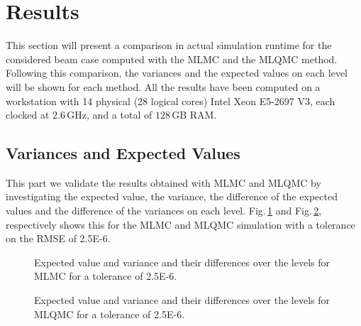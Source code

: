 \documentclass{ICASP13Paper}
\begin{document}
\section{Results}
This section will present a comparison in actual simulation runtime for the considered beam case computed with the MLMC and the MLQMC method. Following this comparison, the variances and the expected values on each level will be shown for each method.  All the results have been computed on a workstation with 14 physical (28 logical cores) Intel Xeon E5-2697 V3, each clocked at $2.6 \,\mathrm{GHz}$, and a total of $128 \,\mathrm{GB}$ RAM.

\subsection{Variances and Expected Values}
This part we validate the results obtained with MLMC and MLQMC by investigating the expected value, the variance, the difference of the expected values and the difference of the variances on each level. Fig.\,\ref{fig:MLMC_var_exp} and Fig.\,\ref{fig:MLQMC_var_exp}, respectively shows this for the MLMC and MLQMC simulation with a tolerance on the RMSE of 2.5E-6.

\begin{figure}[H]
\centering
\begin{subfigure}[b]{0.5\linewidth}
\scalebox{0.5}{
}
\end{subfigure}
\begin{subfigure}[b]{0.5\linewidth}
\scalebox{0.5}{
}
\end{subfigure}
\caption{Expected value and variance and their differences over the levels for MLMC for a tolerance of 2.5E-6.}
\label{fig:MLMC_var_exp}
\end{figure}

\begin{figure}[H]
\centering
\begin{subfigure}[b]{0.5\linewidth}
\scalebox{0.5}{
}
\end{subfigure}
\begin{subfigure}[b]{0.5\linewidth}
\scalebox{0.5}{
}
\end{subfigure}
\caption{Expected value and variance and their differences over the levels for MLQMC for a tolerance of 2.5E-6.}
\label{fig:MLQMC_var_exp}
\end{figure}
\end{document}
